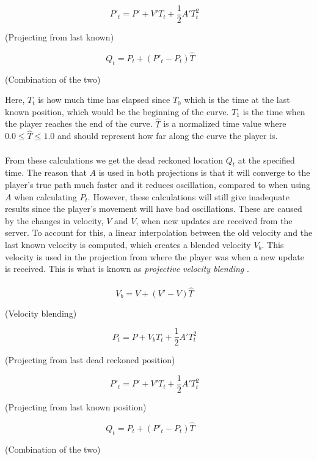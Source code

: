 \begin{displaymath}
    P'_t = P' + V'T_t + \frac{1}{2}A'T_t^2 \quad
\end{displaymath}
\begin{center}
    (Projecting from last known)
\end{center}

\begin{displaymath}
    Q_t = P_t + (P'_t - P_t)\hat{T} \qquad
\end{displaymath}
\begin{center}
    (Combination of the two)
\end{center}
Here, $T_t$ is how much time has elapsed since $T_0$ which is the time at the last known position, which would be the beginning of the curve.
$T_1$ is the time when the player reaches the end of the curve.
$\hat{T}$ is a normalized time value where $0.0\le\hat{T}\le1.0$ and should represent how far along the curve the player is.
\\\\
From these calculations we get the dead reckoned location $ Q_t $ at the specified time.
The reason that $ A $ is used in both projections is that it will converge to the player's true path much faster and it reduces oscillation, compared to when using $ A $ when calculating $ P_t $.
However, these calculations will still give inadequate results since the player's movement will have bad oscillations.
These are caused by the changes in velocity, $V$ and $V$, when new updates are received from the server.
To account for this, a linear interpolation between the old velocity and the last known velocity is computed, which creates a blended velocity $V_b$.
This velocity is used in the projection from where the player was when a new update is received.
This is what is known as \textit{projective velocity blending} \cite{deadreckoning}.
\\\\
\begin{displaymath}
    V_b = V + (V' - V)\hat{T} \quad
\end{displaymath}
\begin{center}
    (Velocity blending)
\end{center}
\begin{displaymath}
    P_t = P + V_bT_t + \frac{1}{2}A'T_t^2 \quad
\end{displaymath}
\begin{center}
    (Projecting from last dead reckoned position)
\end{center}
\begin{displaymath}
    P'_t = P' + V'T_t + \frac{1}{2}A'T_t^2 \quad
\end{displaymath}
\begin{center}
    (Projecting from last known position)
\end{center}
\begin{displaymath}
    Q_t = P_t + (P'_t - P_t)\hat{T} \qquad
\end{displaymath}
\begin{center}
    (Combination of the two)
\end{center}

